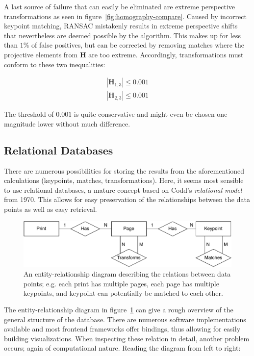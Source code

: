 \documentclass{ltjarticle}
\begin{document}
A last source of failure that can easily be eliminated are extreme perspective transformations as seen in figure~\ref{fig:homography-compare}. Caused by incorrect keypoint matching, RANSAC mistakenly results in extreme perspective shifts that nevertheless are deemed possible by the algorithm. This makes up for less than $1\%$ of false positives, but can be corrected by removing matches where the projective elements from $\mathbf{H}$ are too extreme. Accordingly, transformations must conform to these two inequalities:

\begin{gather*}
    |\mathbf{H}_{1,3}| \leq 0.001\\
    |\mathbf{H}_{2,3}| \leq 0.001
\end{gather*}

The threshold of $0.001$ is quite conservative and might even be chosen one magnitude lower without much difference.

\subsection{Relational Databases}
\label{sec:relational-databases}

There are numerous possibilities for storing the results from the aforementioned calculations (keypoints, matches, transformations). Here, it seems most sensible to use relational databases, a mature concept based on Codd's \emph{relational model} from 1970.\cite{codd1970relational} This allows for easy preservation of the relationships between the data points as well as easy retrieval.

\begin{figure}
    \centering
    \includegraphics[width=\textwidth]{erschema.pdf}
    \caption[Entity-relationship diagram]{An entity-relationship diagram describing the relations between data points; e.g. each print has multiple pages, each page has multiple keypoints, and keypoint can potentially be matched to each other.}
    \label{fig:er-schema}
\end{figure}

The entity-relationship diagram in figure~\ref{fig:er-schema} can give a rough overview of the general structure of the database. There are numerous software implementations available and most frontend frameworks offer bindings, thus allowing for easily building visualizations. When inspecting these relation in detail, another problem occurs; again of computational nature. Reading the diagram from left to right:
\end{document}
